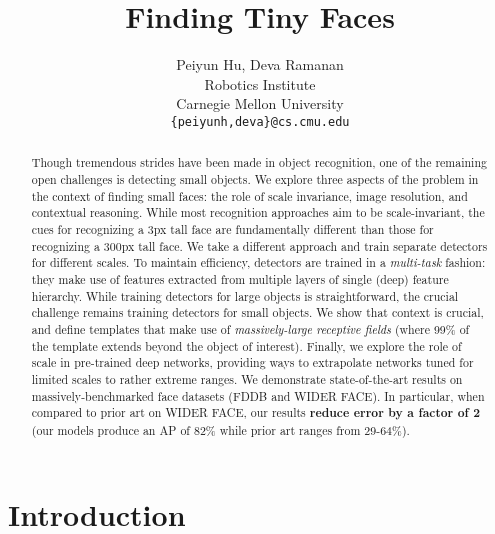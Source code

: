 \documentclass[10pt,twocolumn,letterpaper]{article}
\begin{document}
\title{Finding Tiny Faces}

\author{Peiyun Hu, Deva Ramanan\\
  Robotics Institute\\
  Carnegie Mellon University\\
  {\tt\small \{peiyunh,deva\}@cs.cmu.edu}
}

\maketitle
\thispagestyle{empty}

\begin{abstract}
 Though tremendous strides have been made in object recognition, one of the remaining open challenges is detecting small objects. We explore three aspects of the problem in the context of finding small faces: the role of scale invariance,  image resolution, and contextual reasoning. While most recognition approaches aim to  be scale-invariant, the cues for recognizing a 3px tall face are fundamentally different than those for recognizing a 300px tall face. We take a different approach and train separate detectors for different scales. To maintain efficiency, detectors are trained in a {\em multi-task} fashion: they make use of features extracted from multiple layers of single (deep) feature hierarchy. While training detectors for large objects is straightforward, the crucial challenge remains training detectors for small objects. We show that context is crucial, and define templates that make use of {\em massively-large receptive fields} (where 99\% of the template extends beyond the object of interest). Finally, we explore the role of scale in pre-trained deep networks,  providing ways to extrapolate networks tuned for limited scales to rather extreme ranges. We demonstrate state-of-the-art results on massively-benchmarked face datasets (FDDB and WIDER FACE). In particular, when compared to prior art on WIDER FACE, our results {\bf reduce error by a factor of 2} (our models produce an AP of 82\% while prior art ranges from 29-64\%).
\end{abstract}

\section{Introduction}
\label{sec:intro}
\end{document}
